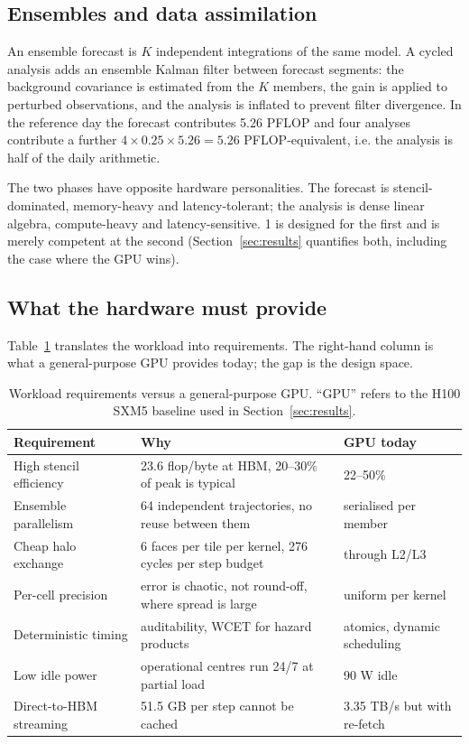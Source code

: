 \subsection{Ensembles and data assimilation}
An ensemble forecast is $K$ independent integrations of the same model. A cycled analysis adds an
ensemble Kalman filter between forecast segments: the background covariance is estimated from the
$K$ members, the gain is applied to perturbed observations, and the analysis is inflated to
prevent filter divergence. In the reference day the forecast contributes 5.26 PFLOP and four
analyses contribute a further $4\times0.25\times5.26 = 5.26$ PFLOP-equivalent, i.e. the analysis
is half of the daily arithmetic.

The two phases have opposite hardware personalities. The forecast is stencil-dominated,
memory-heavy and latency-tolerant; the analysis is dense linear algebra, compute-heavy and
latency-sensitive. \ac{1} is designed for the first and is merely competent at the second
(Section~\ref{sec:results} quantifies both, including the case where the GPU wins).

\subsection{What the hardware must provide}
Table~\ref{tab:req} translates the workload into requirements. The right-hand column is what a
general-purpose GPU provides today; the gap is the design space.

\begin{table}[t]
\centering\small
\caption{Workload requirements versus a general-purpose GPU. ``GPU'' refers to the H100 SXM5
baseline used in Section~\ref{sec:results}.}
\label{tab:req}
\begin{tabularx}{\linewidth}{@{}lXl@{}}
\toprule
Requirement & Why & GPU today\\
\midrule
High stencil efficiency & 23.6 flop/byte at HBM, 20--30\% of peak is typical & 22--50\%\\
Ensemble parallelism & 64 independent trajectories, no reuse between them & serialised per member\\
Cheap halo exchange & 6 faces per tile per kernel, 276 cycles per step budget & through L2/L3\\
Per-cell precision & error is chaotic, not round-off, where spread is large & uniform per kernel\\
Deterministic timing & auditability, WCET for hazard products & atomics, dynamic scheduling\\
Low idle power & operational centres run 24/7 at partial load & 90 W idle\\
Direct-to-HBM streaming & 51.5 GB per step cannot be cached & 3.35 TB/s but with re-fetch\\
\bottomrule
\end{tabularx}
\end{table}

